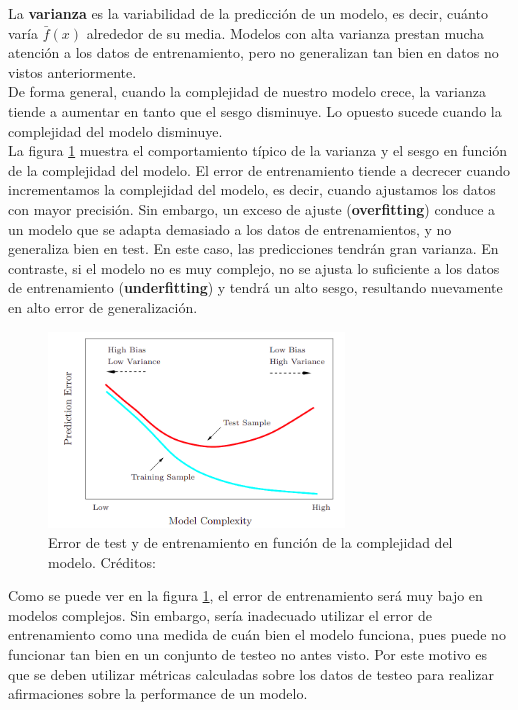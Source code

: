 La \textbf{varianza} es la variabilidad de la predicción de un modelo, es decir, cuánto varía $\bar{f}(x)$ alrededor de su media. Modelos con alta varianza prestan mucha atención a los datos de entrenamiento, pero no generalizan tan bien en datos no vistos anteriormente. \\

De forma general, cuando la complejidad de nuestro modelo crece, la varianza tiende a aumentar en tanto que el sesgo disminuye. Lo opuesto sucede cuando la complejidad del modelo disminuye. \\

La figura \ref{fig:tradeoff} muestra el comportamiento típico de la varianza y el sesgo en función de la complejidad del modelo. El error de entrenamiento tiende a decrecer cuando incrementamos la complejidad del modelo, es decir, cuando ajustamos los datos con mayor precisión. Sin embargo, un exceso de ajuste (\textbf{overfitting}) conduce a un modelo que se adapta demasiado a los datos de entrenamientos, y no generaliza bien en test. En este caso, las predicciones tendrán gran varianza. En contraste, si el modelo no es muy complejo, no se ajusta lo suficiente a los datos de entrenamiento (\textbf{underfitting}) y tendrá un alto sesgo, resultando nuevamente en alto error de generalización.\\ 

\begin{figure}[h!]
\begin{center}
  \includegraphics[width=0.7\textwidth]{Kap1/tradeoff.png} 
  \end{center}
 \caption{ Error de test y de entrenamiento en función de la complejidad del modelo. Créditos: \protect\cite{statisticallearning} }
\label{fig:tradeoff}
\end{figure}

Como se puede ver en la figura \ref{fig:tradeoff}, el error de entrenamiento será muy bajo en modelos complejos. Sin embargo, sería inadecuado utilizar el error de entrenamiento como una medida de cuán bien el modelo funciona, pues puede no funcionar tan bien en un conjunto de testeo no antes visto. Por este motivo es que se deben utilizar métricas calculadas sobre los datos de testeo para realizar afirmaciones sobre la performance de un modelo. \\

